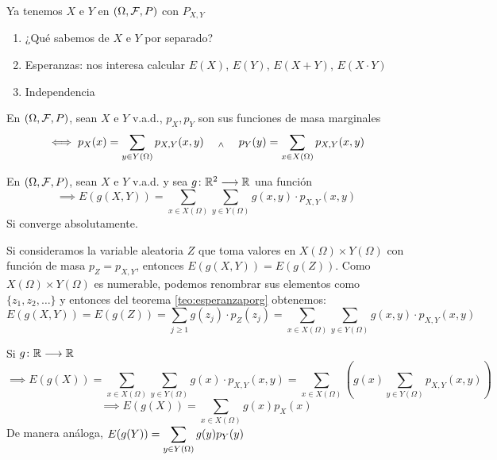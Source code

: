Ya tenemos $X$ e $Y$ en $(\Omega, \mathcal{F}, P)$ con $P_{X,Y}$
\begin{enumerate}[topsep=1pt, itemsep=1pt,parsep=3pt]
	\item ¿Qué sabemos de $X$ e $Y$ por separado?
	\item Esperanzas: nos interesa calcular $E(X)$, $E(Y)$, $E(X+Y)$, $E(X\cdot Y)$
	\item Independencia
\end{enumerate}
\begin{defn}
	En $(\Omega, \mathcal{F}, P)$, sean $X$ e $Y$ v.a.d., $p_{X}, p_{Y}$ son sus funciones de masa marginales
	\[\iff p_X(x)=\sum_{y\in Y(\Omega)} p_{X, Y} (x, y) \quad\; _{\wedge} \;\quad p_Y(y)=\sum_{x\in X(\Omega)} p_{X, Y} (x, y)\]
\end{defn}
\newpage
\begin{teo}
	En $(\Omega, \mathcal{F}, P)$, sean $X$ e $Y$ v.a.d. y sea $g \colon \mathbb{R}^2 \longrightarrow \mathbb{R}$ una función
	\[\implies E(g(X, Y))=\sum_{x\in X(\Omega)} \sum_{y\in Y(\Omega)} g(x, y) \cdot p_{X,Y}(x,y)\]
	Si converge absolutamente.
	\begin{dem}
		Si consideramos la variable aleatoria $Z$ que toma valores en $X(\Omega)\times Y(\Omega)$ con función de masa $p_Z = p_{X,Y}$, entonces $E(g(X, Y))=E(g(Z))$. Como $X(\Omega)\times Y(\Omega)$ es numerable, podemos renombrar sus elementos como $\{z_1, z_2, \dots\}$ y entonces del teorema \ref{teo:esperanzaporg} obtenemos:
		\[E(g(X, Y))=E(g(Z))=\sum_{j\geq 1} g(z_j)\cdot p_Z(z_j) = \sum_{x\in X(\Omega)} \sum_{y\in Y(\Omega)} g(x, y) \cdot p_{X,Y}(x,y)\]
	\end{dem}
\end{teo}

\begin{obs}
	Si $g \colon \mathbb{R} \longrightarrow \mathbb{R}$
	\[\implies E(g(X)) = \sum_{x\in X(\Omega)} \sum_{y\in Y(\Omega)} g(x) \cdot p_{X,Y}(x,y) = \sum_{x\in X(\Omega)} \left(g(x)\sum_{y\in Y(\Omega)}p_{X,Y}(x,y)\right)\]
	\[\implies E(g(X))=\sum_{x\in X(\Omega)} g(x) p_X(x)\]
	De manera análoga, $\displaystyle E(g(Y))=\sum_{y\in Y(\Omega)} g(y) p_Y(y)$
\end{obs}

